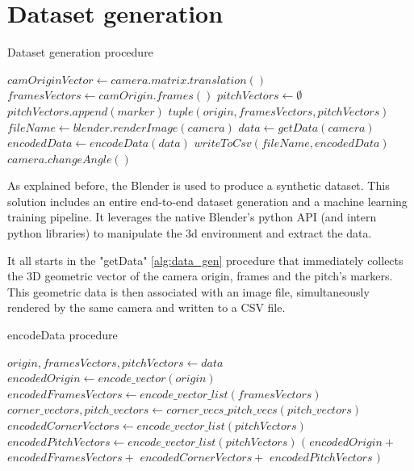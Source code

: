 \documentclass[
    11pt,
    oneside
]{report}
\begin{document}
\section{Dataset generation}


\begin{algorithm}[H]
\begin{algorithmic}
\caption{Dataset generation procedure}\label{alg:data_gen}
    \State $camOriginVector \gets camera.matrix.translation()$
    \State $framesVectors \gets camOrigin.frames()$
    \State $pitchVectors \gets \emptyset$
        \State $pitchVectors.append(marker)$
    \EndFor
    \State
    \Return $tuple(origin, framesVectors, pitchVectors)$
\EndProcedure
{}
    \State $fileName \gets blender.renderImage(camera)$
    \State $data \gets getData(camera)$
    \State $encodedData \gets encodeData(data)$
    \State $writeToCsv(fileName, encodedData)$
    \State $camera.changeAngle()$
\EndFor
\end{algorithmic}
\end{algorithm}


As explained before, the Blender is used to produce a synthetic dataset. This solution includes an entire end-to-end dataset generation and a machine learning training pipeline. It leverages the native Blender's python API (and intern python libraries) to manipulate the 3d environment and extract the data.

It all starts in the "getData" \ref{alg:data_gen} procedure that immediately collects the 3D geometric vector of the camera origin, frames and the pitch's markers. This geometric data is then associated with an image file, simultaneously rendered by the same camera and written to a CSV file.



\begin{algorithm}[H]
\begin{algorithmic}
\caption{encodeData procedure}\label{alg:enc_data}
    \State $origin, framesVectors, pitchVectors \gets data$
    \State $encodedOrigin \gets encode\_vector(origin)$
    \State $encodedFramesVectors \gets encode\_vector\_list(framesVectors)$
    \State $corner\_vectors, pitch\_vectors \gets corner\_vecs\_pitch\_vecs(pitch\_vectors)$
    \State $encodedCornerVectors \gets encode\_vector\_list(pitchVectors)$
    \State $encodedPitchVectors \gets encode\_vector\_list(pitchVectors)$
    \State
    \Return $($
        \State \indent $encodedOrigin +$
        \State \indent $encodedFramesVectors +$
        \State \indent $encodedCornerVectors +$
        \State \indent $encodedPitchVectors$
    \State $)$
\EndProcedure
\end{algorithmic}
\end{algorithm}
\end{document}
